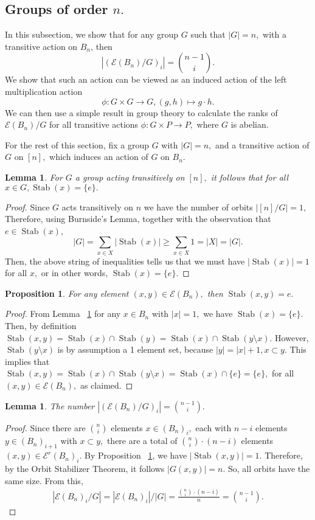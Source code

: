 \documentclass[10 pt]{amsart}
\theoremstyle{plain}
\newtheorem{prop}[thm]{Proposition}
\newtheorem{lem}[thm]{Lemma}
\theoremstyle{definition}
\theoremstyle{remark}
\numberwithin{equation}{section}
\newcommand\ssec{\subsection}
\def\Stab{\operatorname{Stab}}
\begin{document}
\ssec{Groups of order $n.$}

In this subsection, we show that for any group $G$ such that $|G| = n,$ with a transitive action on $B_n$, then $$|(\mathcal E(B_n)/G)_i| = \binom {n-1}{i}.$$ We show that such an action can be viewed as an induced action of the left multiplication action $$\phi: G\times G \rightarrow G,(g,h)\mapsto g \cdot h.$$ We can then use a simple result in group theory to calculate the ranks of $\mathcal E(B_n)/G$ for all transitive actions $\phi:G\times P \rightarrow P,$ where $G$ is abelian.

For the rest of this section, fix a group $G$ with $|G| = n,$ and a transitive action of $G$ on $[n],$ which induces an action of $G$ on $B_n.$

\begin{lem}
\label{lem:stabilizer_one}
For $G$ a group acting transitively on $[n],$ it follows that for all $x \in G,\Stab(x) = \{e\}.$
\end{lem}
\begin{proof}
Since $G$ acts transitively on $n$ we have the number of orbits $|[n]/G| = 1,$ Therefore, using Burnside's Lemma, together with the observation that $e \in \Stab(x)$,
$$|G| = \sum_{x\in X}|\Stab(x)|\geq \sum_{x \in X} 1=|X|= |G|.$$
Then, the above string of inequalities tells us that we must have $|\Stab(x)| = 1$ for all $x,$ or in other words, $\Stab(x) = \{e\}.$
\end{proof}

\begin{prop}
\label{prop:stabilizer_edge}
For any element $(x , y) \in \mathcal E(B_n),$ then $\Stab(x, y) = e.$
\end{prop}
\begin{proof}
From Lemma ~\ref{lem:stabilizer_one} for any $x \in B_n$ with $|x| = 1,$ we have $\Stab(x) = \{e\}.$ Then, by definition $\Stab(x, y) = \Stab(x) \cap \Stab(y) = \Stab(x) \cap \Stab(y \setminus x).$ However, $\Stab(y \setminus x)$ is by assumption a 1 element set, because $|y| = |x| +1,x \subset y.$ This implies that $\Stab(x, y)=\Stab(x) \cap \Stab(y \setminus x) = \Stab(x) \cap \{e\} = \{e\},$ for all $(x, y) \in \mathcal E(B_n),$ as claimed.
\end{proof}

\begin{lem}
\label{lem:q_counts}
The number $\displaystyle |(\mathcal E(B_n)/G)_i| = \binom{n-1}{i}.$
\end{lem}
\begin{proof}
Since there are $\binom{n}{i}$ elements $x\in(B_n)_i,$ each with $n-i$ elements $y \in (B_n)_{i+1}$ with $x \subset y,$ there are a total of $\binom{n}{i}\cdot (n-i)$ elements $(x, y) \in \mathcal E^r(B_n)_i.$ By Proposition ~\ref{prop:stabilizer_edge}, we have $|\Stab(x, y)| = 1.$ Therefore, by the Orbit Stabilizer Theorem, it follows $|G(x, y)| = n.$ So, all orbits have the same size. From this,
\begin{align*}
|\mathcal E(B_n)_i/G| = |\mathcal E(B_n)_i|/|G| = \frac{\binom{n}{i}\cdot (n-i)}{n} = \binom {n-1}{i}.
\end{align*}
\end{proof}
\end{document}

